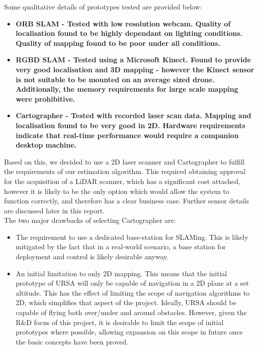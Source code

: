 \documentclass[capstone_report.tex]{subfiles}
\begin{document}
	Some qualitative details of prototypes tested are provided below:
	\begin{itemize}
		\item \bf{ORB SLAM} \normalfont- Tested with low resolution webcam. Quality of localisation found to be highly dependant on lighting conditions. Quality of mapping found to be poor under all conditions.
	 	\item \bf{RGBD SLAM} \normalfont- Tested using a Microsoft Kinect. Found to provide very good localisation and 3D mapping - however the Kinect sensor is not suitable to be mounted on an average sized drone. Additionally, the memory requirements for large scale mapping were prohibitive.
	 	\item \bf{Cartographer} \normalfont- Tested with recorded laser scan data. Mapping and localisation found to be very good in 2D. Hardware requirements indicate that real-time performance would require a companion desktop machine.
	\end{itemize}

	Based on this, we decided to use a 2D laser scanner and Cartographer to fulfill the requirements of our estimation algorithm. This required obtaining approval for the acquisition of a LiDAR scanner, which has a significant cost attached, however it is likely to be the only option which would allow the system to function correctly, and therefore has a clear business case. Further sensor details are discussed later in this report.\\

	The two major drawbacks of selecting Cartographer are:

	\begin{itemize}
	 	\item The requirement to use a dedicated base-station for SLAMing. This is likely mitigated by the fact that in a real-world scenario, a base station for deployment and control is likely desirable anyway.
	 	\item An initial limitation to only 2D mapping. This means that the initial prototype of URSA will only be capable of navigation in a 2D plane at a set altitude. This has the effect of limiting the scope of navigation algorithms to 2D, which simplifies that aspect of the project. Ideally, URSA should be capable of flying both over/under and around obstacles. However, given the R\&D focus of this project, it is desirable to limit the scope of initial prototypes where possible, allowing expansion on this scope in future once the basic concepts have been proved.
	\end{itemize}
\end{document}
